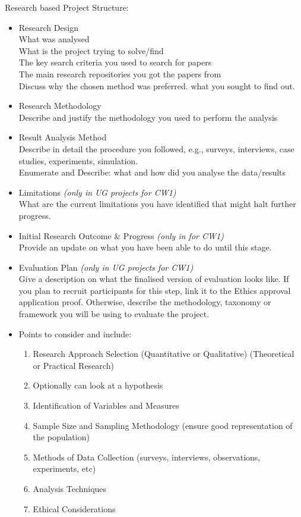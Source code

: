 \vspace{2em}


Research based Project Structure:
\begin{itemize}
    \item Research Design \\
What was analysed\\
What is the project trying to solve/find\\
The key search criteria you used to search for papers\\
The main research repositories you got the papers from\\
Discuss why the chosen method was preferred. what you sought to find out.

    \item Research Methodology \\
Describe and justify the methodology you used to perform the analysis

    \item Result Analysis Method \\
Describe in detail the procedure you followed, e.g., surveys, interviews, case studies, experiments, simulation.\\
Enumerate and Describe: what and how did you analyse the data/results

    \item Limitations \textit{(only in UG projects for CW1)} \\
What are the current limitations you have identified that might halt further progress.
    \item Initial Research Outcome \& Progress \textit{(only in for CW1)} \\
Provide an update on what you have been able to do until this stage.
    \item Evaluation Plan \textit{(only in UG projects for CW1)} \\
Give a description on what the finalised version of evaluation looks like. If you plan to recruit participants for this step, link it to the Ethics approval application proof. Otherwise, describe the methodology, taxonomy or framework you will be using to evaluate the project.

    \item Points to consider and include:

    \begin{enumerate}[label=(\alph*)]
        \item Research Approach Selection (Quantitative or Qualitative) (Theoretical or Practical Research)
        \item Optionally can look at a hypothesis
        \item Identification of Variables and Measures
        \item Sample Size and Sampling Methodology (ensure good representation of the population)
        \item Methods of Data Collection (surveys, interviews, observations, experiments, etc)
        \item Analysis Techniques
        \item Ethical Considerations
    \end{enumerate}
        
\end{itemize}
